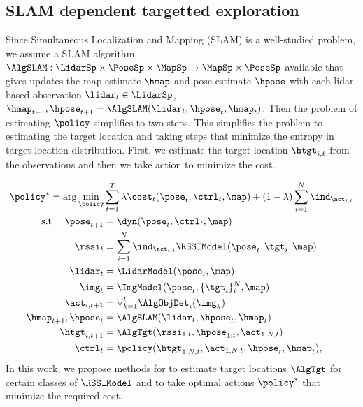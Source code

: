 \subsection{SLAM dependent targetted exploration}

Since Simultaneous Localization and Mapping (SLAM) is a well-studied problem,
we assume a SLAM algorithm $\AlgSLAM: \LidarSp \times \PoseSp \times
\MapSp \rightarrow \MapSp \times \PoseSp$ available that gives updates the map estimate
$\hmap$ and pose estimate $\hpose$ with each lidar-based observation $\lidar_t
\in \LidarSp$, $\hmap_{t+1}, \hpose_{t+1} = \AlgSLAM(\lidar_t, \hpose_t, \hmap_t)$.
Then the problem of estimating $\policy$ simplifies to two steps.
This simplifies the problem to estimating the target location and taking steps
that minimize the entropy in target location distribution.
First, we estimate the target location $\htgt_{i,t}$ from the observations and
then we take action to minimize the cost.

%
\begin{equation}
\begin{aligned}
\policy^* = \arg \min_{\policy} &\sum_{t=1}^T
 \lambda \cost_t(\pose_t, \ctrl_t, \map) + (1-\lambda) \sum_{i=1}^N\ind_{\act_{i,t}}
  \\
  \text{s.t } \quad
  \pose_{t+1} &= \dyn(\pose_t, \ctrl_t, \map)
  \\
  \rssi_{t} &= \sum_{i=1}^N \ind_{\act_{i,t}} \RSSIModel(\pose_t, \tgt_i, \map)
  \\
  \lidar_{t} &= \LidarModel(\pose_t, \map)
  \\
  \img_{t} &= \ImgModel(\pose_t, \{\tgt_i\}_i^N, \map)
  \\
  \act_{i,t+1} &= \lor_{k=1}^t \AlgObjDet_i(\img_k)
  \\
  \hmap_{t+1}, \hpose_t &= \AlgSLAM(\lidar_t, \hpose_t, \hmap_t)
  \\
  \htgt_{i,t+1} &= \AlgTgt(\rssi_{1:t}, \hpose_{1:t}, \act_{1:N,t})
  \\
  \ctrl_t &= \policy(\htgt_{1:N,t}, \act_{1:N,t}, \hpose_t, \hmap_t),
\end{aligned}%
\end{equation}
% 
In this work, we propose methods for to estimate target locations $\AlgTgt$ for
certain classes of $\RSSIModel$ and to take optimal actions $\policy^*$ that
minimize the required cost.